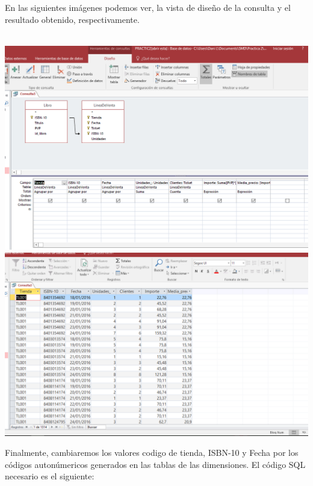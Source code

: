 \documentclass[paper=a4, fontsize=11pt, spanish]{scrartcl}
\numberwithin{equation}{section} %
\numberwithin{figure}{section} %
\numberwithin{table}{section} %
\begin{document}
En las siguientes imágenes podemos ver, la vista de diseño de la consulta y el resultado obtenido, respectivamente.\\
\\
\begin{center}
	\includegraphics[scale=0.35]{sum1.png}
	\includegraphics[scale=0.35]{sum2.png}
\end{center}
\bigskip
Finalmente, cambiaremos los valores codigo de tienda, ISBN-10 y Fecha por los códigos autonúmericos generados en las tablas de las dimensiones.
\newline El código SQL necesario es el siguiente:
\end{document}
